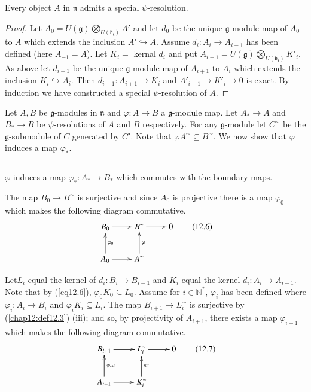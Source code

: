 \begin{lemma}\label{chap12:lem12.4}
Every object $A$ in $\mathfrak{n}$ admits a special
$\psi$-resolution. 
\end{lemma}

\begin{proof}
Let $A_0 = U(\mathfrak{g})
\bigotimes\limits_{U(\mathfrak{b}_\mathfrak{t})} A'$ and let $d_0$ be
the unique $\mathfrak{g}$-module map of $A_0$ to $A$ which extends the
inclusion $A' \hookrightarrow A$. Assume $d_i : A_i \to A_{i-1}$ has
been defined (here $A_{-1} = A$). Let $K_i =$ kernal $d_i$ and put
$A_{i+1} = U(\mathfrak{g})
\bigotimes\limits_{U(\mathfrak{b}_\mathfrak{t})} K'_i$. As above let
$d_{i+1}$ be the unique $\mathfrak{g}$-module map of $A_{i+1}$ to
$A_i$ which extends the inclusion $K_i \hookrightarrow A_i$. Then
$d_{i+1}: A_{i+1} \to K_i$ and $A'_{i+1} \to K'_i \to 0$ is exact. By
induction we have constructed a special $\psi$-resolution of $A$. 
\end{proof}

Let $A,B$ be $\mathfrak{g}$-modules in $\mathfrak{n}$ and $\varphi: A
\to B$ a $\mathfrak{g}$-module map. Let $A_* \to A$ and $B_* \to B$ be 
$\psi$-resolutions of $A$ and $B$ respectively. For any
$\mathfrak{g}$-module let $C^\sim$ be the $\mathfrak{g}$-submodule of
$C$ generated by $C'$. Note that $\varphi A^\sim \subseteq B^\sim$. We
now show that $\varphi$ induces a map $\varphi_*$. 

\setcounter{section}{12}
\setcounter{subsection}{4}
\subsection{}\label{chap12:subsec12.5}
$\varphi$ induces a map $\varphi_*: A_* \to B_*$ which commutes with
the boundary maps. 

The map $B_0 \to B^\sim$ is surjective and since $A_0$ is projective
there is a map $\varphi_0$ which makes the following diagram
commutative. 
\begin{equation*}
\xymatrix{
B_0 \ar[r] & B^\sim  \ar[r] & 0\\
A_0 \ar[r] \ar[u]_{\varphi_0} & A^\sim \ar[u]_\varphi & 
}\tag{12.6}\label{eq12.6}
\end{equation*}

Let\pageoriginale $L_i$ equal the kernel of $d_i : B_i \to B_{i-1}$
and $K_i$ equal the kernel $d_i : A_i \to A_{i-1}$. Note that by
(\ref{eq12.6}), $\varphi_0 K_0 \subseteq L_0$. Assume for $i \in
\mathbb{N}^*$, $\varphi_i$ has been defined where $\varphi_i : A_i \to
B_i$ and $\varphi_i K_i \subseteq L_i$. The map $B_{i + 1} \to L^\sim
_i$ is surjective by (\ref{chap12:def12.3}) (iii); and so, by projectivity of
$A_{i+1}$, there exists a map $\varphi_{i+1}$ which makes the
following diagram commutative. 
\begin{equation*}
\xymatrix{
B_{i+1} \ar[r] & L^\sim_i  \ar[r] & 0\\
A_{i+1} \ar[r] \ar[u]_{\varphi_{i+1}} & K^\sim_i \ar[u]_{\varphi_i} & 
}\tag{12.7}\label{eq12.7}
\end{equation*}


